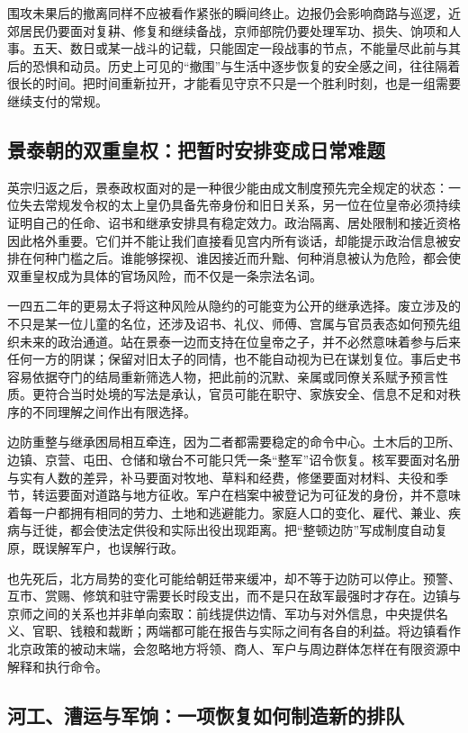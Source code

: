围攻未果后的撤离同样不应被看作紧张的瞬间终止。边报仍会影响商路与巡逻，近郊居民仍要面对复耕、修复和继续备战，京师部院仍要处理军功、损失、饷项和人事。五天、数日或某一战斗的记载，只能固定一段战事的节点，不能量尽此前与其后的恐惧和动员。历史上可见的“撤围”与生活中逐步恢复的安全感之间，往往隔着很长的时间。把时间重新拉开，才能看见守京不只是一个胜利时刻，也是一组需要继续支付的常规。

\subsection{景泰朝的双重皇权：把暂时安排变成日常难题}

英宗归返之后，景泰政权面对的是一种很少能由成文制度预先完全规定的状态：一位失去常规发令权的太上皇仍具备先帝身份和旧日关系，另一位在位皇帝必须持续证明自己的任命、诏书和继承安排具有稳定效力。政治隔离、居处限制和接近资格因此格外重要。它们并不能让我们直接看见宫内所有谈话，却能提示政治信息被安排在何种门槛之后。谁能够探视、谁因接近而升黜、何种消息被认为危险，都会使双重皇权成为具体的官场风险，而不仅是一条宗法名词。

一四五二年的更易太子将这种风险从隐约的可能变为公开的继承选择。废立涉及的不只是某一位儿童的名位，还涉及诏书、礼仪、师傅、宫属与官员表态如何预先组织未来的政治通道。站在景泰一边而支持在位皇帝之子，并不必然意味着参与后来任何一方的阴谋；保留对旧太子的同情，也不能自动视为已在谋划复位。事后史书容易依据夺门的结局重新筛选人物，把此前的沉默、亲属或同僚关系赋予预言性质。更符合当时处境的写法是承认，官员可能在职守、家族安全、信息不足和对秩序的不同理解之间作出有限选择。

边防重整与继承困局相互牵连，因为二者都需要稳定的命令中心。土木后的卫所、边镇、京营、屯田、仓储和墩台不可能只凭一条“整军”诏令恢复。核军要面对名册与实有人数的差异，补马要面对牧地、草料和经费，修堡要面对材料、夫役和季节，转运要面对道路与地方征收。军户在档案中被登记为可征发的身份，并不意味着每一户都拥有相同的劳力、土地和逃避能力。家庭人口的变化、雇代、兼业、疾病与迁徙，都会使法定供役和实际出役出现距离。把“整顿边防”写成制度自动复原，既误解军户，也误解行政。

也先死后，北方局势的变化可能给朝廷带来缓冲，却不等于边防可以停止。预警、互市、赏赐、修筑和驻守需要长时段支出，而不是只在敌军最强时才存在。边镇与京师之间的关系也并非单向索取：前线提供边情、军功与对外信息，中央提供名义、官职、钱粮和裁断；两端都可能在报告与实际之间有各自的利益。将边镇看作北京政策的被动末端，会忽略地方将领、商人、军户与周边群体怎样在有限资源中解释和执行命令。

\subsection{河工、漕运与军饷：一项恢复如何制造新的排队}

